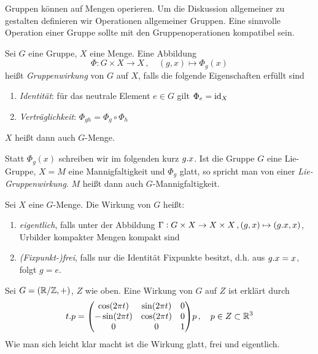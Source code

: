 Gruppen können auf Mengen operieren.  Um die Diskussion allgemeiner zu gestalten definieren wir
Operationen allgemeiner Gruppen. 
Eine sinnvolle Operation einer Gruppe sollte mit den Gruppenoperationen
kompatibel sein. 
\begin{definition}[Gruppenwirkung]
Sei $G$ eine Gruppe, $X$ eine Menge. Eine Abbildung
\begin{equation}
\Phi:G\times X\to X\,,\quad (g,x)\mapsto\Phi_g(x)
\end{equation}
heißt \emph{Gruppenwirkung} von $G$ auf $X$, falls die folgende Eigenschaften
erfüllt sind
\begin{enumerate}
  \item \emph{Identität}: für das neutrale Element $e\in G$ gilt
  $\displaystyle\Phi_e=\operatorname{id}_X$
  \item \emph{Verträglichkeit}: $\displaystyle\Phi_{gh}=\Phi_g\circ\Phi_h$
\end{enumerate}
$X$ heißt dann auch $G$-Menge.
\end{definition}
Statt $\Phi_g(x)$ schreiben wir im folgenden kurz $g. x$.
Ist die Gruppe $G$ eine Lie-Gruppe, $X=M$ eine Mannigfaltigkeit und $\Phi_g$
glatt, so spricht man von einer \emph{Lie-Gruppenwirkung}. $M$ heißt dann
auch $G$-Mannigfaltigkeit.
\begin{definition}
Sei $X$ eine $G$-Menge. Die Wirkung von $G$ heißt:
\begin{enumerate}
  \item \emph{eigentlich}, falls unter der Abbildung $\Gamma:
  G\times X\to X\times X\,,(g,x)\mapsto (g . x,x)$, Urbilder kompakter
  Mengen kompakt sind
  \item \emph{(Fixpunkt-)frei}, falls nur die Identität Fixpunkte besitzt, d.h.
  aus $g. x=x$, folgt $g=e$.
\end{enumerate}
\end{definition}
\begin{beispiel}
Sei $G=(\mathbb{R}/\mathbb{Z},+)$, $Z$ wie oben. Eine Wirkung von $G$ auf $Z$ ist
erklärt durch
\begin{equation}
t.p= \begin{pmatrix}
\cos\left( 2\pi t\right)&\sin\left( 2\pi t\right)&0\\
-\sin\left( 2\pi t\right)&\cos\left( 2\pi t\right)&0\\
0&0&1
\end{pmatrix}p\,,\quad p\in Z\subset \Reals^3
\end{equation}
Wie man sich leicht klar macht ist die Wirkung glatt, frei und eigentlich.
\end{beispiel}
